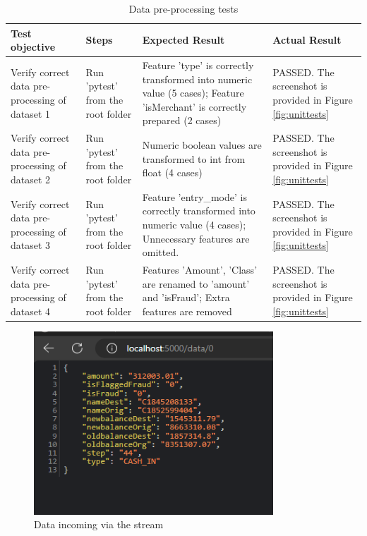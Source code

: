 \documentclass[12pt,a4paper, hidelinks]{article}
\begin{document}
\begin{table}[h!]
  \centering
  \begin{tabular}{|p{3cm}|p{2cm}|p{4cm}|p{5cm}|}
  \hline
  \textbf{Test objective} & \textbf{Steps} & \textbf{Expected Result} & \textbf{Actual Result} \\
  \hline
  Verify correct data pre-processing of dataset 1 & Run 'pytest' from the root folder & Feature 'type' is correctly transformed into numeric value (5 cases); Feature 'isMerchant' is correctly prepared (2 cases) & PASSED. The screenshot is provided in Figure \ref{fig:unittests} \\
  \hline
  Verify correct data pre-processing of dataset 2 & Run 'pytest' from the root folder & Numeric boolean values are transformed to int from float (4 cases) & PASSED. The screenshot is provided in Figure \ref{fig:unittests} \\
  \hline
  Verify correct data pre-processing of dataset 3 & Run 'pytest' from the root folder & Feature 'entry\_mode' is correctly transformed into numeric value (4 cases); Unnecessary features are omitted. & PASSED. The screenshot is provided in Figure \ref{fig:unittests} \\
  \hline
  Verify correct data pre-processing of dataset 4 & Run 'pytest' from the root folder & Features 'Amount', 'Class' are renamed to 'amount' and 'isFraud'; Extra features are removed & PASSED. The screenshot is provided in Figure \ref{fig:unittests} \\
  \hline
  \end{tabular}
  \caption{Data pre-processing tests}
  \end{table}


\begin{figure}[h!]
  \centering
  \includegraphics[width=0.8\textwidth]{images/test-stream-M2.png}
  \caption{Data incoming via the stream}
  \label{fig:streaming-api}
\end{figure}
\end{document}
